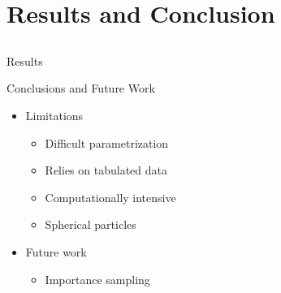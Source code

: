 \documentclass{beamer}
\begin{document}
\section{Results and Conclusion}
\subsection{ }

\begin{frame}{Results}

\end{frame}

\begin{frame}{Conclusions and Future Work}

\begin{itemize}
\setlength\itemsep{0.5em}
\item Limitations
	\begin{itemize}
	\setlength\itemsep{0.5em}
	\item Difficult parametrization
	\item Relies on tabulated data
	\item Computationally intensive
	\item Spherical particles
	\end{itemize}
\item Future work
	\begin{itemize}
	\setlength\itemsep{0.5em}
	\item Importance sampling 
	\end{itemize}
\end{itemize}

\end{frame}

\section*{}
\end{document}

